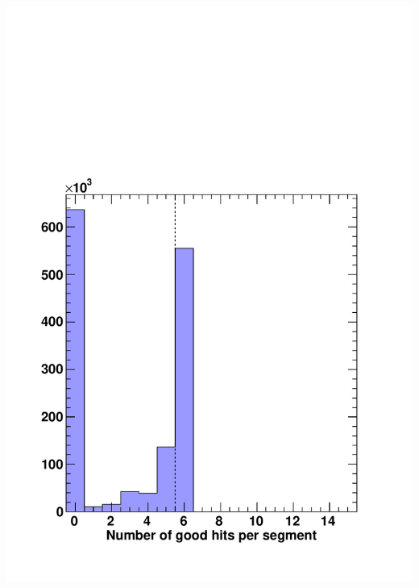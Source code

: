 \documentclass[compress]{beamer}
\begin{document}
\begin{frame}
\begin{columns}
\includegraphics[width=\linewidth]{MCBeamHalo_hits_on_segments.pdf}

\end{columns}
\end{frame}
\end{document}
